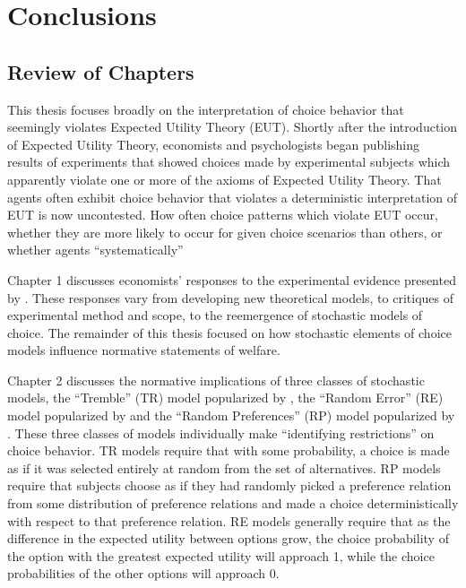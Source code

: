 \documentclass[../main.tex]{subfiles}
\begin{document}
\doublespacing
\setcounter{chapter}{4}

\chapter{Conclusions}


\section{Review of Chapters}

This thesis focuses broadly on the interpretation of choice behavior that seemingly violates Expected Utility Theory (EUT).
Shortly after the introduction of Expected Utility Theory, economists and psychologists began publishing results of experiments that showed choices made by experimental subjects which apparently violate one or more of the axioms of Expected Utility Theory.
That agents often exhibit choice behavior that violates a deterministic interpretation of EUT is now uncontested.
How often choice patterns which violate EUT occur, whether they are more likely to occur for given choice scenarios than others, or whether agents \enquote{systematically}

Chapter 1 discusses economists' responses to the experimental evidence presented by \textcite{Grether1979}.
These responses vary from developing new theoretical models, to critiques of experimental method and scope, to the reemergence of stochastic models of choice.
The remainder of this thesis focused on how stochastic elements of choice models influence normative statements of welfare.

Chapter 2 discusses the normative implications of three classes of stochastic models, the \enquote{Tremble} (TR) model popularized by \textcite{Harless1994}, the \enquote{Random Error} (RE) model popularized by \textcite{Hey1994} and the \enquote{Random Preferences} (RP) model popularized by \textcite{Loomes1998}.
These three classes of models individually make \enquote{identifying restrictions} \parencite{Ballinger1997} on choice behavior.
TR models require that with some probability, a choice is made as if it was selected entirely at random from the set of alternatives.
RP models require that subjects choose as if they had randomly picked a preference relation from some distribution of preference relations and made a choice deterministically with respect to that preference relation.
RE models generally require that as the difference in the expected utility between options grow, the choice probability of the option with the greatest expected utility will approach 1, while the choice probabilities of the other options will approach 0.
\end{document}
